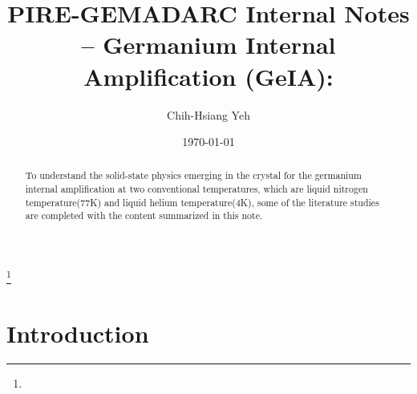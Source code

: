 \documentclass[%
 reprint,
 amsmath,amssymb,
 aps,
]{revtex4-2}
\begin{document}

\title{PIRE-GEMADARC Internal Notes – Germanium Internal Amplification (GeIA):\\}%
\thanks{}%

\author{Chih-Hsiang Yeh}




\date{\today}%

\begin{abstract}
To understand the solid-state physics emerging in the crystal for the germanium internal amplification at two conventional temperatures, which are liquid nitrogen temperature(77K) and liquid helium temperature(4K), some of the literature studies are completed with the content summarized in this note. 
\end{abstract}


\maketitle

\tableofcontents


\section{\label{sec:level1}Introduction}
\end{document}
